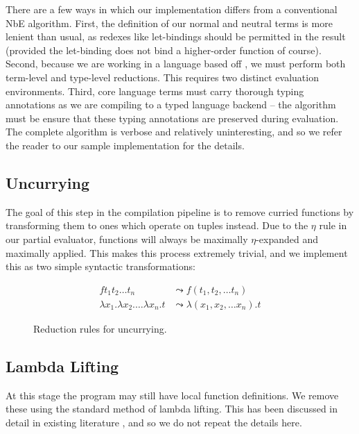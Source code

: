 \documentclass[runningheads]{llncs}
\begin{document}
There are a few ways in which our implementation differs from a conventional NbE algorithm. First, the definition of our normal and neutral terms is more lenient than usual, as redexes like let-bindings should be permitted in the result (provided the let-binding does not bind a higher-order function of course). Second, because we are working in a language based off \fom{}, we must perform both term-level and type-level reductions. This requires two distinct evaluation environments. Third, core language terms must carry thorough typing annotations as we are compiling to a typed language backend -- the algorithm must be ensure that these typing annotations are preserved during evaluation. The complete algorithm is verbose and relatively uninteresting, and so we refer the reader to our sample implementation for the details.


\subsection{Uncurrying}

The goal of this step in the compilation pipeline is to remove curried functions by transforming them to ones which operate on tuples instead. Due to the $\eta$ rule in our partial evaluator, functions will always be maximally $\eta$-expanded and maximally applied. This makes this process extremely trivial, and we implement this as two simple syntactic transformations:

\begin{figure*}[h]
  \begin{minipage}[c]{\textwidth}
    \begin{align*}
      f t_1 t_2 \ldots t_n &\leadsto f(t_1, t_2, \ldots t_n) \\
      \lambda x_1. \lambda x_2. \ldots \lambda x_n. t &\leadsto \lambda (x_1, x_2, \ldots x_n). t
    \end{align*}
  \end{minipage}

  \caption{Reduction rules for uncurrying.}
  \label{fig:uncurrying-rules}
\end{figure*}

\subsection{Lambda Lifting}

At this stage the program may still have local function definitions. We remove these using the standard method of lambda lifting. This has been discussed in detail in existing literature \cite{danvy2002lambda,morazan2008optimal}, and so we do not repeat the details here.
\end{document}

